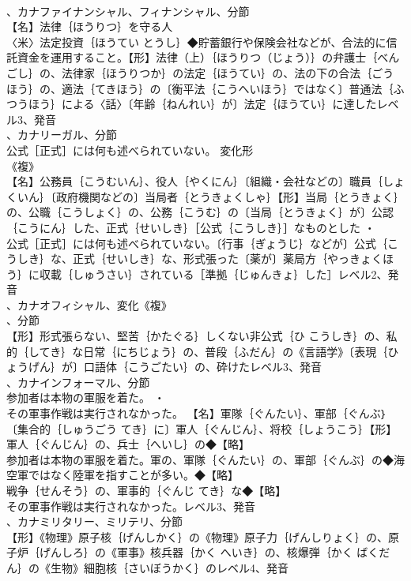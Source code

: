 \documentclass[8pt]{extreport}
\begin{document}
\begin{CJK}{UTF8}{min}
\\	、カナファイナンシャル、フィナンシャル、分節
\\	【名】法律｛ほうりつ｝を守る人
\\	〈米〉法定投資｛ほうてい とうし｝◆貯蓄銀行や保険会社などが、合法的に信託資金を運用すること。【形】法律（上）｛ほうりつ（じょう）｝の弁護士｛べんごし｝の、法律家｛ほうりつか｝の法定｛ほうてい｝の、法の下の合法｛ごうほう｝の、適法｛てきほう｝の〔衡平法｛こうへいほう｝ではなく〕普通法｛ふつうほう｝による〈話〉〔年齢｛ねんれい｝が〕法定｛ほうてい｝に達したレベル3、発音
\\	、カナリーガル、分節
\\	公式［正式］には何も述べられていない。	変化形 
\\	《複》
\\	【名】公務員｛こうむいん｝、役人｛やくにん｝〔組織・会社などの〕職員｛しょくいん｝〔政府機関などの〕当局者｛とうきょくしゃ｝【形】当局｛とうきょく｝の、公職｛こうしょく｝の、公務｛こうむ｝の〔当局｛とうきょく｝が〕公認｛こうにん｝した、正式｛せいしき｝［公式｛こうしき｝］なものとした ・
\\	公式［正式］には何も述べられていない。〔行事｛ぎょうじ｝などが〕公式｛こうしき｝な、正式｛せいしき｝な、形式張った〔薬が〕薬局方｛やっきょくほう｝に収載｛しゅうさい｝されている［準拠｛じゅんきょ｝した］レベル2、発音
\\	、カナオフィシャル、変化《複》
\\	、分節
\\	【形】形式張らない、堅苦｛かたぐる｝しくない非公式｛ひ こうしき｝の、私的｛してき｝な日常｛にちじょう｝の、普段｛ふだん｝の《言語学》〔表現｛ひょうげん｝が〕口語体｛こうごたい｝の、砕けたレベル3、発音
\\	、カナインフォーマル、分節
\\	参加者は本物の軍服を着た。 ・
\\	その軍事作戦は実行されなかった。		【名】軍隊｛ぐんたい｝、軍部｛ぐんぶ｝〔集合的｛しゅうごう てき｝に〕軍人｛ぐんじん｝、将校｛しょうこう｝【形】軍人｛ぐんじん｝の、兵士｛へいし｝の◆【略】
\\	参加者は本物の軍服を着た。軍の、軍隊｛ぐんたい｝の、軍部｛ぐんぶ｝の◆海空軍ではなく陸軍を指すことが多い。◆【略】
\\	戦争｛せんそう｝の、軍事的｛ぐんじ てき｝な◆【略】
\\	その軍事作戦は実行されなかった。レベル3、発音
\\	、カナミリタリー、ミリテリ、分節
\\	【形】《物理》原子核｛げんしかく｝の《物理》原子力｛げんしりょく｝の、原子炉｛げんしろ｝の《軍事》核兵器｛かく へいき｝の、核爆弾｛かく ばくだん｝の《生物》細胞核｛さいぼうかく｝のレベル4、発音

\end{CJK}
\end{document}
